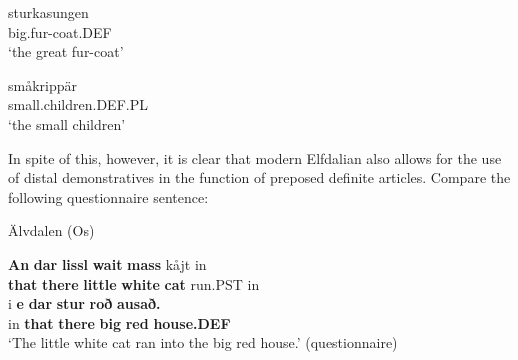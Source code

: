  \ea\label{}
\gll sturkasungen  \\


big.fur-coat.DEF  \\

\glt ‘the great fur-coat’

\z

\item 


 \ea\label{}
\gll småkrippär\\


small.children.DEF.PL\\

\glt ‘the small children’

\z

In spite of this, however, it is clear that modern Elfdalian also allows for the use of distal demonstratives in the function of preposed definite articles. Compare the following questionnaire sentence:


\item 

Älvdalen (Os)



 \ea\label{}
\gll \textbf{An} \textbf{dar} \textbf{lissl} \textbf{wait} \textbf{mass} kåjt  in\\


\textbf{that} \textbf{there} \textbf{little} \textbf{white} \textbf{cat} run.PST  in\\

 \ea\label{}\gll\gll i  \textbf{e}\textbf{  dar}\textbf{  stur}\textbf{  roð}\textbf{  ausað.}\\


in  \textbf{that} \textbf{there} \textbf{big} \textbf{red} \textbf{house.DEF}\\

\glt ‘The little white cat ran into the big red house.’ (questionnaire)

